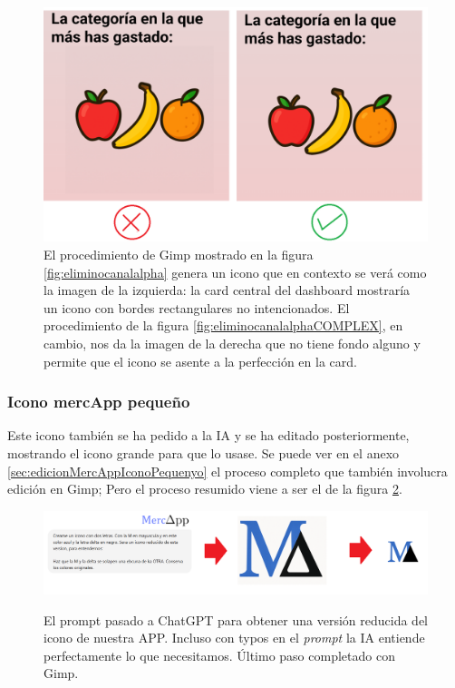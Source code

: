 \documentclass[a4paper,12pt]{report}
\begin{document}
\FloatBarrier
\setlength{\belowcaptionskip}{3pt}
\begin{figure}[H]
	\centering
	\caption{El procedimiento de Gimp mostrado en la figura \ref{fig:eliminocanalalpha} genera un icono que en contexto se verá como la imagen de la izquierda: la card central del dashboard mostraría un icono con bordes rectangulares no intencionados. El procedimiento de la figura \ref{fig:eliminocanalalphaCOMPLEX}, en cambio, nos da la imagen de la derecha que no tiene fondo alguno y permite que el icono se asente a la perfección en la card.}
	\includegraphics[width=1\linewidth]{img/ventatjaProcedComplexVSsimple.png}

	
	\label{fig:ventatjaProcedComplexVSsimple}
\end{figure}
\FloatBarrier
	
	
	\subsubsection{Icono mercApp pequeño}
	\label{sec:iconoMercappPetitMEMORIAPPAL}
	Este icono también se ha pedido a la IA y se ha editado posteriormente, mostrando el icono grande para que lo usase. Se puede ver en el anexo \ref{sec:edicionMercAppIconoPequenyo} el proceso completo que también involucra edición en Gimp; Pero el proceso resumido viene a ser el de la figura \ref{fig:mercappResumit}.
		
		
	\FloatBarrier
	\setlength{\belowcaptionskip}{3pt}
	\begin{figure}[H]
		\centering
		\caption{El prompt pasado a ChatGPT para obtener una versión reducida del icono de nuestra APP. Incluso con typos en el \textit{prompt} la IA entiende perfectamente lo que necesitamos. Último paso completado con Gimp.}
		\includegraphics[width=1\linewidth]{img/mercappResumit}
		\label{fig:mercappResumit}
	\end{figure}
	\FloatBarrier
		
\end{document}
